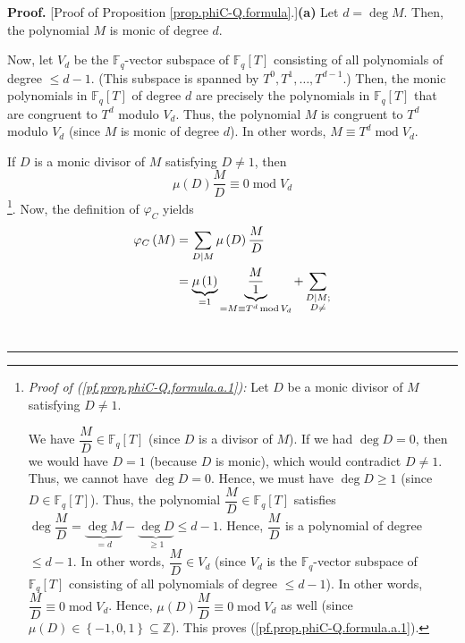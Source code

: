 \documentclass[numbers=enddot,12pt,final,onecolumn,notitlepage]{scrartcl}%
\theoremstyle{definition}
\newenvironment{proof}[1][Proof]{\noindent\textbf{#1.} }{\ \rule{0.5em}{0.5em}}
\let\sumnonlimits\sum
\renewcommand{\sum}{\sumnonlimits\limits}
\begin{document}
\begin{proof}
[Proof of Proposition \ref{prop.phiC-Q.formula}.]\textbf{(a)} Let $d=\deg M$.
Then, the polynomial $M$ is monic of degree $d$.

Now, let $V_{d}$ be the $\mathbb{F}_{q}$-vector subspace of $\mathbb{F}%
_{q}\left[  T\right]  $ consisting of all polynomials of degree $\leq d-1$.
(This subspace is spanned by $T^{0},T^{1},\ldots,T^{d-1}$.) Then, the monic
polynomials in $\mathbb{F}_{q}\left[  T\right]  $ of degree $d$ are precisely
the polynomials in $\mathbb{F}_{q}\left[  T\right]  $ that are congruent to
$T^{d}$ modulo $V_{d}$. Thus, the polynomial $M$ is congruent to $T^{d}$
modulo $V_{d}$ (since $M$ is monic of degree $d$). In other words, $M\equiv
T^{d}\operatorname{mod}V_{d}.$

If $D$ is a monic divisor of $M$ satisfying $D\neq1$, then
\begin{equation}
\mu\left(  D\right)  \dfrac{M}{D}\equiv0\operatorname{mod}V_{d}
\label{pf.prop.phiC-Q.formula.a.1}%
\end{equation}
\footnote{\textit{Proof of (\ref{pf.prop.phiC-Q.formula.a.1}):} Let $D$ be a
monic divisor of $M$ satisfying $D\neq1$.
\par
We have $\dfrac{M}{D}\in\mathbb{F}_{q}\left[  T\right]  $ (since $D$ is a
divisor of $M$). If we had $\deg D=0$, then we would have $D=1$ (because $D$
is monic), which would contradict $D\neq1$. Thus, we cannot have $\deg D=0$.
Hence, we must have $\deg D\geq1$ (since $D\in\mathbb{F}_{q}\left[  T\right]
$). Thus, the polynomial $\dfrac{M}{D}\in\mathbb{F}_{q}\left[  T\right]  $
satisfies $\deg\dfrac{M}{D}=\underbrace{\deg M}_{=d}-\underbrace{\deg D}%
_{\geq1}\leq d-1$. Hence, $\dfrac{M}{D}$ is a polynomial of degree $\leq d-1$.
In other words, $\dfrac{M}{D}\in V_{d}$ (since $V_{d}$ is the $\mathbb{F}_{q}%
$-vector subspace of $\mathbb{F}_{q}\left[  T\right]  $ consisting of all
polynomials of degree $\leq d-1$). In other words, $\dfrac{M}{D}%
\equiv0\operatorname{mod}V_{d}$. Hence, $\mu\left(  D\right)  \dfrac{M}%
{D}\equiv0\operatorname{mod}V_{d}$ as well (since $\mu\left(  D\right)
\in\left\{  -1,0,1\right\}  \subseteq\mathbb{Z}$). This proves
(\ref{pf.prop.phiC-Q.formula.a.1}).}. Now, the definition of $\varphi_{C}$
yields%
\begin{align*}
\varphi_{C}\left(  M\right)   &  =\sum\limits_{D\mid M}\mu\left(  D\right)
\dfrac{M}{D}\\
&  =\underbrace{\mu\left(  1\right)  }_{=1}\underbrace{\dfrac{M}{1}}_{=M\equiv
T^{d}\operatorname{mod}V_{d}}+\sum\limits_{\substack{D\mid M;\\D\neq
}}
\end{align*}
\end{proof}
\end{document}
